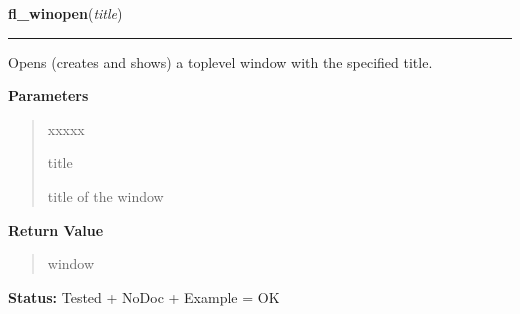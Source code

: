 \hspace{.8\funcindent}\begin{boxedminipage}{\funcwidth}

    \raggedright \textbf{fl\_winopen}(\textit{title})

    \vspace{-1.5ex}

    \rule{\textwidth}{0.5\fboxrule}
\setlength{\parskip}{2ex}
    Opens (creates and shows) a toplevel window with the specified title.

\setlength{\parskip}{1ex}
      \textbf{Parameters}
      \vspace{-1ex}

      \begin{quote}
        \begin{Ventry}{xxxxx}

          \item[title]

          title of the window

        \end{Ventry}

      \end{quote}

      \textbf{Return Value}
    \vspace{-1ex}

      \begin{quote}
      window

      \end{quote}

\textbf{Status:} Tested + NoDoc + Example = OK



    \end{boxedminipage}

    \label{xformslib:library:fl_winhide}

    \vspace{0.5ex}


